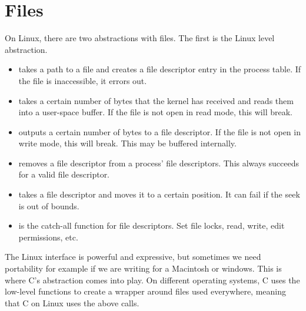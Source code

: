 \section{Files}
	 
On Linux, there are two abstractions with files. The first is the Linux  level abstraction.
	 
\begin{itemize}
	\item {} takes a path to a file and creates a file descriptor entry in the process table. If the file is inaccessible, it errors out.
	\item {} takes a certain number of bytes that the kernel has received and reads them into a user-space buffer. If the file is not open in read mode, this will break.
	\item {} outputs a certain number of bytes to a file descriptor. If the file is not open in write mode, this will break. This may be buffered internally.
	\item {} removes a file descriptor from a process' file descriptors. This always succeeds for a valid file descriptor.
	\item {} takes a file descriptor and moves it to a certain position. It can fail if the seek is out of bounds.
	\item {} is the catch-all function for file descriptors. Set file locks, read, write, edit permissions, etc.
\end{itemize}
	 
The Linux interface is powerful and expressive, but sometimes we need portability for example if we are writing for a Macintosh or windows.
This is where C's abstraction comes into play.
On different operating systems, C uses the low-level functions to create a wrapper around files used everywhere, meaning that C on Linux uses the above calls.
	 
